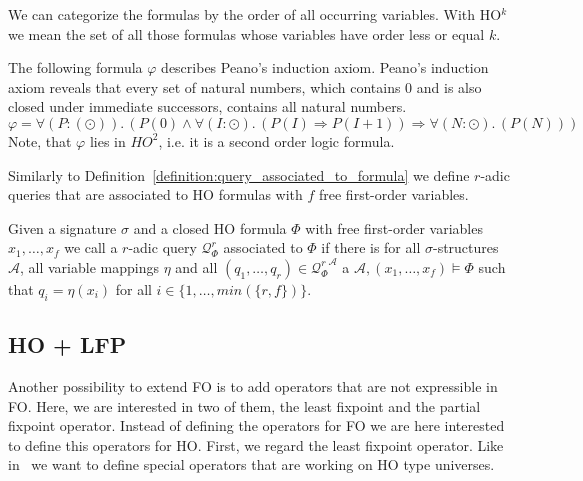 We can categorize the formulas by the order of all occurring variables. With HO$^k$ we mean the set of all those
formulas whose variables have order less or equal $k$.

\begin{example}{\cite{vanBenthem2001higher}}
    \label{example:ho}
    The following formula $\varphi$ describes Peano's induction axiom. Peano's induction axiom reveals that every set
    of natural numbers, which contains $0$ and is also closed under immediate successors, contains all natural numbers.
    \[\varphi = \forall (P\colon(\odot)).\,(P(0) \wedge \forall (I\colon\odot).\,(P(I) \Rightarrow P(I + 1)) \Rightarrow
    \forall (N \colon\odot).\,(P(N)))\]
    Note, that $\varphi$ lies in $\mathit{HO}^2$, i.e. it is a second order logic formula.
\end{example}

Similarly to Definition~\ref{definition:query_associated_to_formula} we define $r$-adic queries that are associated to HO formulas with $f$ free first-order variables. 

\begin{definition}
\label{definition:query_associated_to_formula_ho}
    Given a signature $\sigma$ and a closed HO
    formula $\Phi$ with free first-order variables $x_1, \dots, x_f$ we call a $r$-adic query $\mathcal{Q}^r_\Phi$ associated to $\Phi$ if there is for all $\sigma$-structures
    $\mathcal{A}$, all variable mappings $\eta$ and all $(q_1, \dots, q_r) \in {\mathcal{Q}^r_\Phi}^\mathcal{A}$ a $\mathcal{A}, (x_1, \dots, x_f) \models
     \Phi$ such that $q_i = \eta(x_i)$ for all $i \in
    \{1, \dots, min(\{r, f\})\}$.
\end{definition}

\subsection{HO + LFP}
\label{subsec:hoPlusLfp}

Another possibility to extend FO is to add operators that are not expressible in FO. Here, we are interested in two
of them, the least fixpoint and the partial fixpoint operator. Instead of defining the operators for FO we are
here interested to define this operators for HO. First, we regard the least fixpoint operator.
Like in~\cite{freireMartins2011descriptive} we want to define special operators that are working on HO type universes.


